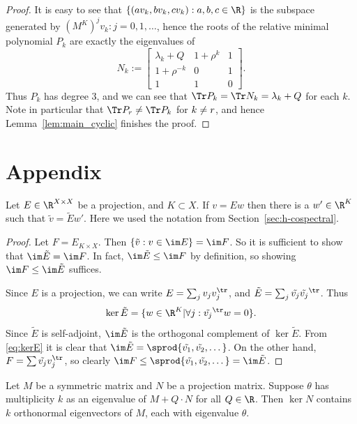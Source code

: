 \begin{proof}
It is easy to see that $\{ (a v_k, b v_k, c v_k) : a,b,c \in \R\}$ is the subspace generated by $(M^K)^j v_k : j = 0,1, \dots$, hence the roots of the relative minimal polynomial $P_k$ are exactly the eigenvalues of 
\[
N_k:=\begin{bmatrix}\lambda_k+Q&1+\rho^k&1\\1+\rho^{-k}&0&1\\1&1&0\end{bmatrix}.
\]
 Thus $P_k$ has degree 3, and we can see that $\Tr P_k = \Tr N_k = \lambda_k+Q$ for each $k$. Note in particular that $\Tr P_\ord \neq \Tr P_k$ for $k\neq r$, and hence Lemma~\ref{lem:main_cyclic} finishes the proof. 
\end{proof}
 
\section{Appendix}

\begin{lemma}\label{lem:imE}
Let $E \in \R^{X\times X}$ be a projection, and $K\subset X$. If $v = E w$ then there is a $w' \in \R^K$ such that $\tilde{v} = \tilde{E} w'$. Here we used the notation from Section~\ref{sec:h-cospectral}.
\end{lemma}

\begin{proof}
Let $F = E_{K \times X}$. Then $\{ \tilde{v} : v \in \im E\} = \im F$. So it is sufficient to show that $\im \tilde{E} = \im F$. In fact, $\im \tilde{E} \leq \im F$ by definition, so showing $\im F \leq \im \tilde{E}$ suffices.

Since $E$ is a projection, we can write $E = \sum_j v_j v_j^{\tr}$, and $\tilde{E} = \sum_j \tilde{v_j} \tilde{v_j}^{\tr}$. Thus \begin{equation}\label{eq:kerE}
\ker \tilde{E} = \{ w \in \R^K | \forall j: \tilde{v_j}^{\tr} w = 0\}.\end{equation} Since $\tilde{E}$ is self-adjoint, $\im \tilde{E}$ is the orthogonal complement of $\ker \tilde{E}$. From \eqref{eq:kerE} it is clear that $\im \tilde{E} = \sprod{\tilde{v_1}, \tilde{v_2}, \dots}$. On the other hand, $F = \sum \tilde{v_j} v_j^{\tr}$, so clearly $\im F \leq  \sprod{\tilde{v_1}, \tilde{v_2}, \dots} = \im \tilde{E}$.
\end{proof}

\begin{lemma}\label{lem:vanishing}
Let $M$ be a symmetric matrix and $N$ be a projection matrix. Suppose $\theta$ has multiplicity $k$ as an eigenvalue of $M+ Q \cdot N$ for all $Q \in \R$. Then $\ker N$ contains $k$ orthonormal eigenvectors of $M$, each with eigenvalue $\theta$.
\end{lemma}

